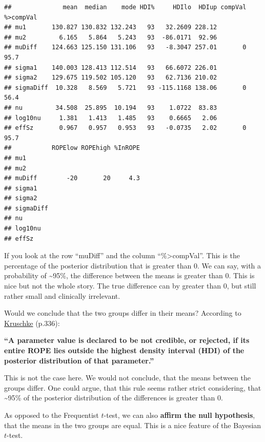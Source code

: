 \documentclass[
]{book}
\begin{document}
\begin{verbatim}
##              mean  median    mode HDI%     HDIlo  HDIup compVal %>compVal
## mu1       130.827 130.832 132.243   93   32.2609 228.12                  
## mu2         6.165   5.864   5.243   93  -86.0171  92.96                  
## muDiff    124.663 125.150 131.106   93   -8.3047 257.01       0      95.7
## sigma1    140.003 128.413 112.514   93   66.6072 226.01                  
## sigma2    129.675 119.502 105.120   93   62.7136 210.02                  
## sigmaDiff  10.328   8.569   5.721   93 -115.1168 138.06       0      56.4
## nu         34.508  25.895  10.194   93    1.0722  83.83                  
## log10nu     1.381   1.413   1.485   93    0.6665   2.06                  
## effSz       0.967   0.957   0.953   93   -0.0735   2.02       0      95.7
##           ROPElow ROPEhigh %InROPE
## mu1                               
## mu2                               
## muDiff        -20       20     4.3
## sigma1                            
## sigma2                            
## sigmaDiff                         
## nu                                
## log10nu                           
## effSz
\end{verbatim}

If you look at the row ``muDiff'' and the column ``\%\textgreater compVal''. This is the percentage
of the posterior distribution that is greater than 0. We can say, with a probability of
\textasciitilde95\%, the difference between the means is greater than 0. This is nice but not the whole story.
The true difference can by greater than 0, but still rather small and clinically irrelevant.

Would we conclude that the two groups differ in their means?
According to \href{https://nyu-cdsc.github.io/learningr/assets/kruschke_bayesian_in_R.pdf}{Kruschke} (p.336):

\textbf{``A parameter value is declared to be not credible,
or rejected, if its entire ROPE lies outside the highest density interval
(HDI) of the posterior distribution of that parameter.''}

This is not the case here. We would not conclude, that the means between the groups differ.
One could argue, that this rule seems rather strict considering, that \textasciitilde95\% of the
posterior distribution of the differences is greater than 0.

As opposed to the Frequentist \(t\)-test, we can also \textbf{affirm the null hypothesis},
that the means in the two groups are equal. This is a nice feature of the Bayesian \(t\)-test.
\end{document}
